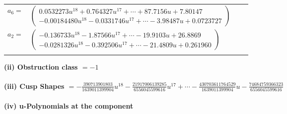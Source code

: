 \documentclass[1p]{elsarticle_modified}
\theoremstyle{definition}
\begin{document}
\begin{tabular}{m{7pt} m{180pt} m{7pt} m{180pt} }
\flushright $a_{6}=$&$\begin{pmatrix}0.0532273 u^{18}+0.764327 u^{17}+\cdots+87.7156 u+7.80147\\-0.00184480 u^{18}-0.0331746 u^{17}+\cdots-3.98487 u+0.0723727\end{pmatrix}$ \\
\flushright $a_{2}=$&$\begin{pmatrix}-0.136733 u^{18}-1.87566 u^{17}+\cdots-19.9103 u+26.8869\\-0.0281326 u^{18}-0.392506 u^{17}+\cdots-21.4809 u+0.261960\end{pmatrix}$\\&\end{tabular}
\flushleft \textbf{(ii) Obstruction class $= -1$}\\~\\
\flushleft \textbf{(iii) Cusp Shapes $= -\frac{390713901803}{1639011399904} u^{18}-\frac{21917006139285}{6556045599616} u^{17}+\cdots-\frac{430703611764529}{1639011399904} u-\frac{74684759366323}{6556045599616}$}\\~\\
\newpage\renewcommand{\arraystretch}{1}
\flushleft \textbf{(iv) u-Polynomials at the component}\newline \\
\end{document}
